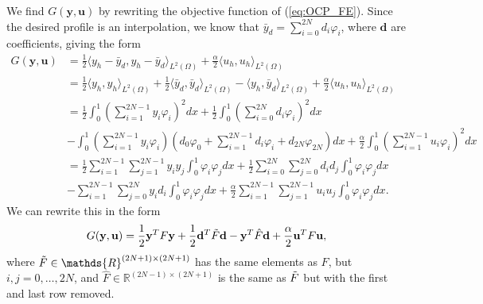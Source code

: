 We find $G(\mathbf{y, u})$ by rewriting the objective function of (\ref{eq:OCP_FE}).
Since the desired profile is an interpolation, we know that $\bar{y}_d = \sum_{i=0}^{2N}d_i\varphi_i$, where $\mathbf{d}$ are coefficients, giving the form
\begin{align*}
    G(\mathbf{y, u}) &= \frac{1}{2}\langle y_h - \bar{y}_d, y_h - \bar{y}_d \rangle_{L^2{(\Omega)}} + \frac{\alpha}{2} \langle u_h, u_h \rangle_{L^2(\Omega)} \\
   &= \frac{1}{2}\langle y_h , y_h \rangle_{L^2{(\Omega)}} +  \frac{1}{2}\langle \bar{y}_d ,\bar{y}_d  \rangle_{L^2{(\Omega)}}
   - \langle y_h, \bar{y}_d \rangle_{L^2{(\Omega)}} + \frac{\alpha}{2} \langle u_h, u_h \rangle_{L^2(\Omega)} \\
     &= \frac{1}{2}\int_0^1\left( \sum_{i=1}^{2N-1}y_i \varphi_i \right)^2dx  + \frac{1}{2}\int_0^1\left( \sum_{i=0}^{2N}d_i \varphi_i \right)^2dx \\
     &- \int_0^1\left( \sum_{i=1}^{2N-1}y_i \varphi_i \right) \left(d_0 \varphi_0 + \sum_{i=1}^{2N-1} d_i \varphi_i + d_{2N} \varphi_{2N} \right)dx + 
     \frac{\alpha}{2}\int_0^1\left(\sum_{i=1}^{2N-1} u_i \varphi_i  \right)^2dx \\    
     &= \frac{1}{2}\sum_{i=1}^{2N-1}\sum_{j=1}^{2N-1} y_i y_j \int_0^1 \varphi_i \varphi_j dx + \frac{1}{2}\sum_{i=0}^{2N}\sum_{j=0}^{2N} d_i d_j \int_0^1 \varphi_i \varphi_j dx \\
    &- \sum_{i=1}^{2N-1} \sum_{j=0}^{2N} y_i d_i \int_0^1 \varphi_i \varphi_j dx +  \frac{\alpha}{2}\sum_{i=1}^{2N-1}\sum_{j=1}^{2N-1} u_i u_j \int_0^1\varphi_i \varphi_j dx.
\end{align*}
We can rewrite this in the form
$$
G(\mathbf{y, u}) = \frac{1}{2}\mathbf{y}^T F \mathbf{y} + \frac{1}{2}\mathbf{d}^T\Tilde{F} \mathbf{d} - \mathbf{y}^T\hat{F}\mathbf{d} + \frac{\alpha}{2}\mathbf{u}^T F \mathbf{u},
$$
where $\Tilde{F} \in \mathds{R}^{(2N+1) \times (2N+1)}$ has the same elements as $F$, but $i, j = 0, \dots, 2N$, 
and $\hat{F} \in \mathds{R}^{(2N-1) \times (2N+1)}$ is the same as $\Tilde{F}$ but with the first and last row removed.  

